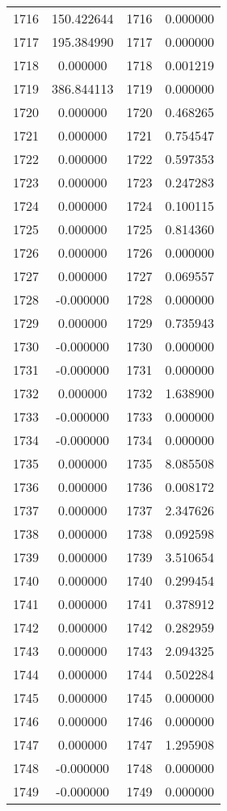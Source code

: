 \documentclass[12pt]{article}
\begin{document}
\begin{longtable}{@{}cccc@{}}
1716 & 150.422644 & 1716 & 0.000000 \\
1717 & 195.384990 & 1717 & 0.000000 \\
1718 & 0.000000 & 1718 & 0.001219 \\
1719 & 386.844113 & 1719 & 0.000000 \\
1720 & 0.000000 & 1720 & 0.468265 \\
1721 & 0.000000 & 1721 & 0.754547 \\
1722 & 0.000000 & 1722 & 0.597353 \\
1723 & 0.000000 & 1723 & 0.247283 \\
1724 & 0.000000 & 1724 & 0.100115 \\
1725 & 0.000000 & 1725 & 0.814360 \\
1726 & 0.000000 & 1726 & 0.000000 \\
1727 & 0.000000 & 1727 & 0.069557 \\
1728 & -0.000000 & 1728 & 0.000000 \\
1729 & 0.000000 & 1729 & 0.735943 \\
1730 & -0.000000 & 1730 & 0.000000 \\
1731 & -0.000000 & 1731 & 0.000000 \\
1732 & 0.000000 & 1732 & 1.638900 \\
1733 & -0.000000 & 1733 & 0.000000 \\
1734 & -0.000000 & 1734 & 0.000000 \\
1735 & 0.000000 & 1735 & 8.085508 \\
1736 & 0.000000 & 1736 & 0.008172 \\
1737 & 0.000000 & 1737 & 2.347626 \\
1738 & 0.000000 & 1738 & 0.092598 \\
1739 & 0.000000 & 1739 & 3.510654 \\
1740 & 0.000000 & 1740 & 0.299454 \\
1741 & 0.000000 & 1741 & 0.378912 \\
1742 & 0.000000 & 1742 & 0.282959 \\
1743 & 0.000000 & 1743 & 2.094325 \\
1744 & 0.000000 & 1744 & 0.502284 \\
1745 & 0.000000 & 1745 & 0.000000 \\
1746 & 0.000000 & 1746 & 0.000000 \\
1747 & 0.000000 & 1747 & 1.295908 \\
1748 & -0.000000 & 1748 & 0.000000 \\
1749 & -0.000000 & 1749 & 0.000000 \\

\end{longtable}
\end{document}
